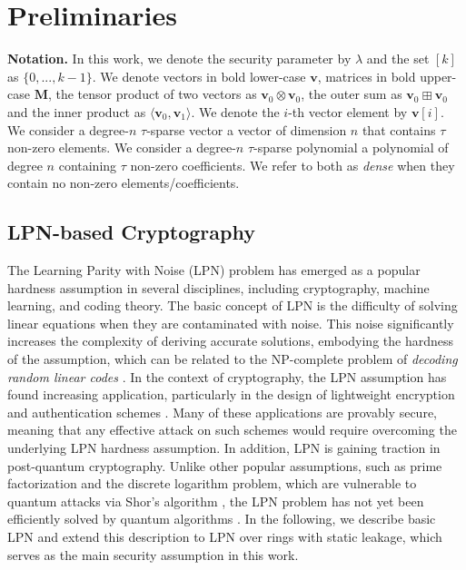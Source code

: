 \chapter{Preliminaries}

\textbf{Notation.} In this work, we denote the security parameter by $\lambda$ and the set $[k]$ as $\{0, ..., k-1\}$. We denote vectors in bold lower-case $\mathbf{v}$, matrices in bold upper-case $\mathbf{M}$, the tensor product of two vectors as $\mathbf{v}_0\otimes\mathbf{v}_0$, the outer sum as $\mathbf{v}_0\boxplus\mathbf{v}_0$ and the inner product as $\langle\boldsymbol{v}_0,\boldsymbol{v}_1\rangle$. We denote the $i$-th vector element by $\mathbf{v}[i]$. We consider a degree-$n$ $\tau$-sparse vector a vector of dimension $n$ that contains $\tau$ non-zero elements. We consider a degree-$n$ $\tau$-sparse polynomial a polynomial of degree $n$ containing $\tau$ non-zero coefficients. We refer to both as \textit{dense} when they contain no non-zero elements/coefficients.

\section{LPN-based Cryptography}
The Learning Parity with Noise (LPN) problem has emerged as a popular hardness assumption in several disciplines, including cryptography, machine learning, and coding theory. The basic concept of LPN is the difficulty of solving linear equations when they are contaminated with noise. This noise significantly increases the complexity of deriving accurate solutions, embodying the hardness of the assumption, which can be related to the NP-complete problem of \textit{decoding random linear codes} \cite{yu2016pseudorandom}. In the context of cryptography, the LPN assumption has found increasing application, particularly in the design of lightweight encryption and authentication schemes \cite{pietrzak2012cryptography}. Many of these applications are provably secure, meaning that any effective attack on such schemes would require overcoming the underlying LPN hardness assumption. In addition, LPN is gaining traction in post-quantum cryptography. Unlike other popular assumptions, such as prime factorization and the discrete logarithm problem, which are vulnerable to quantum attacks via Shor's algorithm \cite{shor1999polynomial}, the LPN problem has not yet been efficiently solved by quantum algorithms \cite{zhao2018hardness}. 
In the following, we describe basic LPN and extend this description to LPN over rings with static leakage, which serves as the main security assumption in this work.

